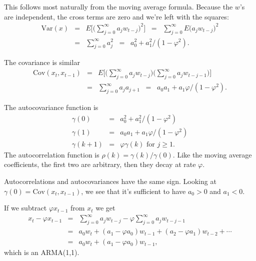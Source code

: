 \documentclass[11pt]{exam}
\begin{document}
\begin{questions}
\begin{solution}
\begin{parts}
\item This follows most naturally from the moving average formula.
Because the $w$'s are independent, the cross terms are zero and we're left with the squares:  
\begin{eqnarray*}
    \mbox{Var}(x) &=& E \Big[ \Big( \sum_{j=0}^\infty a_j w_{t-j}\Big)^2 \Big] 
                \;\;=\;\; \sum_{j=0}^\infty  E \big(  a_j w_{t-j}\big)^2  \\
                &=& \sum_{j=0}^\infty  a_j^2 
                \;\;=\;\; a_0^2 + a_1^2 /(1-\varphi^2) .
\end{eqnarray*}
\item The covariance is similar
\begin{eqnarray*}
    \mbox{Cov}(x_t, x_{t-1}) &=& E \Big[ \Big( \sum_{j=0}^\infty a_j w_{t-j}\Big)
                    \Big( \sum_{j=0}^\infty a_j w_{t-j-1}\Big) \Big] \\
                &=& \sum_{j=0}^\infty  a_j a_{j+1} 
                \;\;=\;\; a_0 a_1 + a_1 \varphi/(1-\varphi^2) .
\end{eqnarray*}
\item The autocovariance function is 
\begin{eqnarray*}
    \gamma(0) &=& a_0^2 + a_1^2 /(1-\varphi^2)  \\
    \gamma(1) &=& a_0 a_1 + a_1 \varphi/(1-\varphi^2)  \\
    \gamma(k+1) &=& \varphi \gamma(k) \mbox{ for } j\geq 1.  
\end{eqnarray*}
The autocorrelation function is $ \rho(k) = \gamma(k)/\gamma(0)$.  
Like the moving average coefficients, the first two are arbitrary, then they decay at rate $\varphi$. 

\item Autocorrelations and autocovariances have the same sign.
Looking at $\gamma(0) = \mbox{Cov}(x_t,x_{t-1})$, we see that 
it's sufficient to have $a_0 > 0$ and $a_1 < 0$.  

\item If we subtract $\varphi x_{t-1}$ from $x_t$ we get
\begin{eqnarray*}
    x_t - \varphi x_{t-1}  &=& \sum_{j=0}^\infty a_j w_{t-j} - \varphi \sum_{j=0}^\infty a_j w_{t-j-1} \\
            &=& a_0 w_t + (a_1 - \varphi a_0) w_{t-1} + (a_2 - \varphi a_1) w_{t-2} + \cdots \\
            &=& a_0 w_t + (a_1 - \varphi a_0) w_{t-1} ,
\end{eqnarray*}
which is an ARMA(1,1).  


\end{parts}
\end{solution}
\end{questions}
\end{document}
